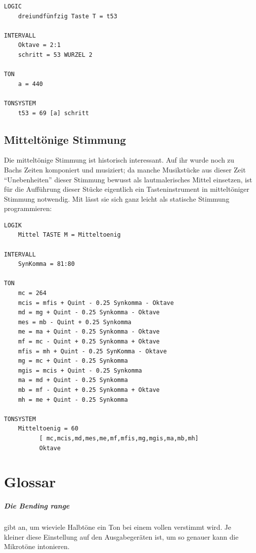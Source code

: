 {

\begin{verbatim}
LOGIC
    dreiundfünfzig Taste T = t53

INTERVALL 
    Oktave = 2:1
    schritt = 53 WURZEL 2

TON
    a = 440 

TONSYSTEM
    t53 = 69 [a] schritt
\end{verbatim}

\section{Mitteltönige Stimmung}
\label{sec:EX_MITTELTOENIG}

Die mitteltönige Stimmung ist historisch interessant. Auf ihr 
wurde noch zu Bachs Zeiten komponiert und musiziert; da manche 
Musikstücke aus dieser Zeit "`Unebenheiten"' dieser Stimmung 
bewusst als lautmalerisches Mittel einsetzen, ist für die 
Aufführung dieser Stücke eigentlich ein Tasteninstrument 
in mitteltöniger Stimmung notwendig. Mit \mutabor{} lässt 
sie sich ganz leicht als statische Stimmung programmieren:



\begin{verbatim}
LOGIK 
    Mittel TASTE M = Mitteltoenig

INTERVALL 
    SynKomma = 81:80

TON
    mc = 264 
    mcis = mfis + Quint - 0.25 Synkomma - Oktave 
    md = mg + Quint - 0.25 Synkomma - Oktave 
    mes = mb - Quint + 0.25 Synkomma 
    me = ma + Quint - 0.25 Synkomma - Oktave 
    mf = mc - Quint + 0.25 Synkomma + Oktave 
    mfis = mh + Quint - 0.25 SynKomma - Oktave 
    mg = mc + Quint - 0.25 Synkomma 
    mgis = mcis + Quint - 0.25 Synkomma 
    ma = md + Quint - 0.25 Synkomma 
    mb = mf - Quint + 0.25 Synkomma + Oktave 
    mh = me + Quint - 0.25 Synkomma

TONSYSTEM
    Mitteltoenig = 60 
          [ mc,mcis,md,mes,me,mf,mfis,mg,mgis,ma,mb,mh] 
          Oktave
\end{verbatim}

\appendix

\chapter{Glossar}

\paragraph{Die Bending range}\label{sec:DV_BENDINGRANGE}gibt an,
  um wieviele Halbtöne ein Ton bei einem vollen
   verstimmt wird. Je kleiner diese
  Einstellung auf den Ausgabegeräten ist, um so genauer kann
  \mutabor{} die Mikrotöne intonieren.

}
